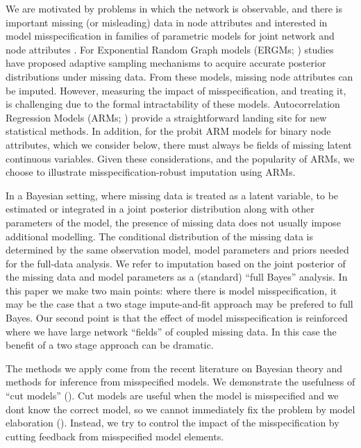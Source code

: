 \documentclass{article}
\begin{document}
We are motivated by problems in which the network is observable, and there is important missing (or misleading) data in node attributes and interested in model misspecification in families of parametric models for joint network and node attributes \cite{snijders2011statistical}. For Exponential Random Graph models (ERGMs; \cites{frank1986markov, wasserman1996logit, holland1981exponential}) studies have proposed adaptive sampling mechanisms to acquire accurate posterior distributions \cites{zimmermanimproving, koskinen2013bayesian, hancock2007modeling, gile2017analysis} under missing data. From these models, missing node attributes can be imputed. However, measuring the impact of misspecification, and treating it, is challenging due to the formal intractability of these models. Autocorrelation Regression Models (ARMs; \cites{ord1975estimation, smith2004bayesian, anselin2013spatial}) provide a straightforward landing site for new statistical methods. In addition, for the probit ARM models for binary node attributes,
 which we consider below, there must always be fields of missing latent continuous variables.
 Given these considerations, and the popularity of ARMs, we choose to illustrate misspecification-robust imputation using ARMs.

In a Bayesian setting, where missing data is treated as a latent variable, to be estimated or integrated in a joint posterior distribution along with other parameters of the model, the presence of missing data does not usually impose additional modelling. The conditional distribution of the missing data is determined by the same observation model, model parameters and priors needed for the full-data analysis. We refer to imputation based on the joint posterior of the missing data and model parameters as a (standard) ``full Bayes'' analysis. In this paper we make two main points: where there is model misspecification, it may be the case that a two stage impute-and-fit approach may be prefered to full Bayes. Our second point is that the effect of model misspecification is reinforced where we have large network ``fields'' of coupled missing data. In this case the benefit of a two stage approach can be dramatic.

The methods we apply come from the recent literature on Bayesian theory and methods for inference from misspecified models. We demonstrate the usefulness of ``cut models'' (\cites{plummer2015cuts, lunn2009combining}). Cut models are useful when the model is misspecified and we dont know the correct model, so we cannot immediately fix the problem by model elaboration (\cite{gelman2004parameterization}). Instead, we try to control the impact of the misspecification by cutting feedback from misspecified model elements.
\end{document}
